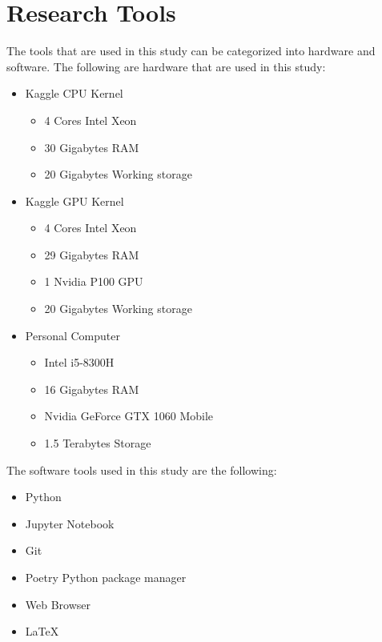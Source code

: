 \section{Research Tools}
\noindent The tools that are used in this study can be categorized into hardware and software. The following are hardware that are used in this study:
\begin{itemize}
      \item Kaggle CPU Kernel~\autocite{GettingStartedKaggle}
            \begin{itemize}
                  \item 4 Cores Intel Xeon
                  \item 30 Gigabytes RAM
                  \item 20 Gigabytes Working storage
            \end{itemize}
      \item Kaggle GPU Kernel~\autocite{GettingStartedKaggle}
            \begin{itemize}
                  \item 4 Cores Intel Xeon
                  \item 29 Gigabytes RAM
                  \item 1 Nvidia P100 GPU
                  \item 20 Gigabytes Working storage
            \end{itemize}
      \item Personal Computer
            \begin{itemize}
                  \item Intel i5{-}8300H
                  \item 16 Gigabytes RAM
                  \item Nvidia GeForce GTX 1060 Mobile
                  \item 1.5 Terabytes Storage
            \end{itemize}
\end{itemize}
The software tools used in this study are the following:
\begin{itemize}
      \item Python
      \item Jupyter Notebook
      \item Git
      \item Poetry Python package manager
      \item Web Browser
      \item \LaTeX{}
\end{itemize}
